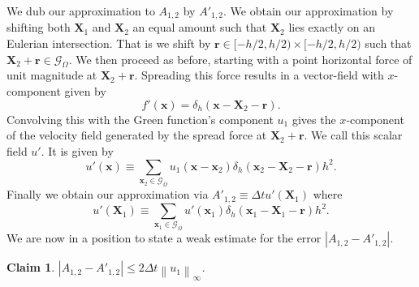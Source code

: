 \documentclass[preprint,12pt]{elsarticle}
\newcommand{\norm}[1]{\left\lVert#1\right\rVert}
\newtheorem{claim}{Claim}[section]
\begin{document}
We dub our approximation to $A_{1,2}$ by $A'_{1,2}$. We obtain our approximation by shifting both $\mathbf{X}_1$ and $\mathbf{X}_2$ an equal amount such that $\mathbf{X}_2$ lies exactly on an Eulerian intersection. That is we shift by $\mathbf{r}\in[-h/2,h/2)\times[-h/2,h/2)$ such that $\mathbf{X}_2 +\mathbf{r}\in\mathcal{G}_\Omega$. We then proceed as before, starting with a point horizontal force of unit magnitude at $\mathbf{X}_2+\mathbf{r}$. Spreading this force results in a vector-field with $x$-component given by
\begin{equation}
f'(\mathbf{x}) = \delta_h(\mathbf{x} - \mathbf{X}_2 - \mathbf{r}).
\end{equation}
Convolving this with the Green function's component $u_1$ gives the $x$-component of the velocity field generated by the spread force at $\mathbf{X}_2+\mathbf{r}$. We call this scalar field $u'$. It is given by
\begin{equation}
u'(\mathbf{x}) \equiv
\sum_{\mathbf{x}_2\in\mathcal{G}_\Omega}
u_1(\mathbf{x} - \mathbf{x}_2)\delta_h(\mathbf{x}_2 - \mathbf{X}_2 - \mathbf{r})h^2.
\end{equation}
Finally we obtain our approximation via $A'_{1,2} \equiv \Delta t u'(\mathbf{X}_1)$ where
\begin{equation}
u'(\mathbf{X}_1) \equiv
\sum_{\mathbf{x}_1\in\mathcal{G}_\Omega}
u'(\mathbf{x}_1)\delta_h(\mathbf{x}_1 - \mathbf{X}_1 - \mathbf{r})h^2.
\end{equation}
We are now in a position to state a weak estimate for the error $|A_{1,2}-A'_{1,2}|$.
\begin{claim}
$|A_{1,2}-A'_{1,2}| \leq 2\Delta t \norm{u_1}_\infty$.
\end{claim}
\end{document}
